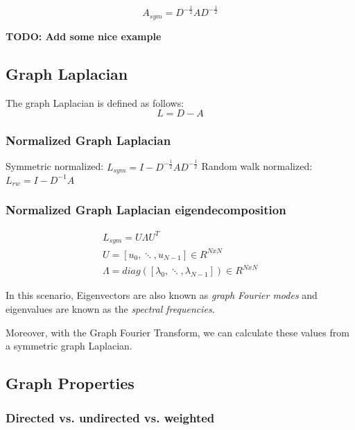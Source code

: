 \begin{equation}
    A_{sym} =  D^{-\frac{1}{2}} A D^{-\frac{1}{2}}
\end{equation}

\textbf{TODO: Add some nice example}

\subsection{Graph Laplacian}
The graph Laplacian is defined as follows:
\begin{equation}
    L = D - A
\end{equation}


\subsubsection{Normalized Graph Laplacian}

Symmetric normalized: $L_{sym} = I - D^{-\frac{1}{2}} A D^{-\frac{1}{2}}$
Random walk normalized: $L_{rw} = I - D^{-1} A$

\subsubsection{Normalized Graph Laplacian eigendecomposition}

\begin{equation}
    \begin{aligned}
        L_{sym} =U \Lambda U^T \\
        U = [u_0, \ddots, u_{N-1}] \in R^{N x N}\\
        \Lambda = diag ( [\lambda_0, \ddots, \lambda_{N-1}] ) \in R^{N x N}
    \end{aligned}
\end{equation}

In this scenario, Eigenvectors are also known as \textit{graph Fourier modes}
and eigenvalues are known as the \textit{spectral frequencies}.

Moreover, with the Graph Fourier Transform, we can calculate these values from a symmetric
graph Laplacian.

\subsection{Graph Properties}

\subsubsection{Directed vs. undirected vs. weighted}

